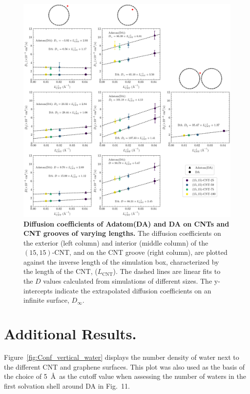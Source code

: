 \documentclass[journal=jpcbfk, layout=twocolumn, manuscript=article]{achemso}
\begin{document}
\begin{figure}[h]
    \centering
    \includegraphics[width=\textwidth]{Figures/finite_size_work/finite_size_work.png}
    \caption{\textbf{Diffusion coefficients of Adatom(DA) and DA on CNTs and CNT grooves of varying lengths.} The diffusion coefficients on the exterior (left column) and interior (middle column) of the $(15,15)$-CNT, and on the CNT groove (right column), are plotted against the inverse length of the simulation box, characterized by the length of the CNT, ($L_\mathrm{CNT}$). The dashed lines are linear fits to the $D$ values calculated from simulations of different sizes. The y-intercepts indicate the extrapolated diffusion coefficients on an infinite surface, $D_\infty$.
    }
    \label{fig:Tech_boxsize_calibration}
\end{figure}

\section{Additional Results.}

Figure~\ref{fig:Conf_vertical_water} displays the number density of water next to the different CNT and graphene surfaces. This plot was also used as the basis of the choice of 5~\AA\ as the cutoff value when assessing the number of waters in the first solvation shell around DA in Fig.~11.
\end{document}
